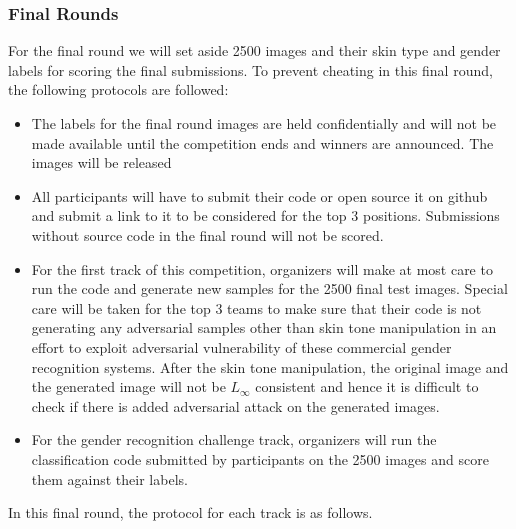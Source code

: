 \documentclass[11pt, oneside]{article}
\begin{document}
\subsubsection{Final Rounds}
For the final round we will set aside 2500 images and their skin type and 
gender labels for scoring the final submissions. To prevent cheating in this 
final round, the following protocols are followed:

\begin{itemize}
    \item The labels for the final round images are held confidentially and 
    will not be made available until the competition ends and winners are 
    announced. The images will be released
    \item All participants will have to submit their code or open source it on 
    github and submit a link to it to be considered for the top 3 positions. 
    Submissions without source code in the final round will not be scored.
    \item For the first track of this competition, organizers will make at most 
    care to run the code and generate new samples for the 2500 final test 
    images. Special care will be taken for the top 3 teams to make sure that 
    their code is not generating any adversarial samples other than skin tone 
    manipulation in an effort to exploit adversarial vulnerability of these 
    commercial gender recognition systems. After the skin tone manipulation, 
    the original image and the generated image will not be $L_{\infty}$ 
    consistent and hence it is difficult to check if there is added adversarial 
    attack on the generated images.
    \item For the gender recognition challenge track, organizers will run the 
    classification code submitted by participants on the 2500 images and score 
    them against their labels.
\end{itemize}


In this final round, the protocol for each track is as follows.
\end{document}
